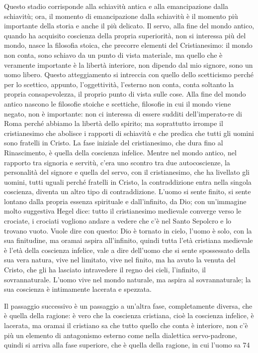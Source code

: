 \documentclass[a4paper,12pt,oneside,openany]{book}%
\begin{document}
Questo stadio corrisponde alla schiavitù antica e alla emancipazione dalla schiavitù; ora, il momento di emancipazione dalla schiavitù è il momento più importante della storia e anche il più delicato.
Il servo, alla fine del mondo antico, quando ha acquisito coscienza della propria superiorità, non si interessa più del mondo, nasce la filosofia stoica, che precorre elementi del Cristianesimo: il mondo non conta, sono schiavo da un punto di vista materiale, ma quello che è veramente importante è la libertà interiore, non dipendo dal mio signore, sono un uomo libero. Questo atteggiamento si intreccia con quello dello scetticismo perché per lo scettico, appunto, l’oggettività, l’esterno non conta, conta soltanto la propria consapevolezza, il proprio punto di vista sulle cose. Alla fine del mondo antico nascono le filosofie stoiche e scettiche, filosofie in cui il mondo viene negato, non è importante: non ci interessa di essere sudditi dell’imperato-re di Roma perché abbiamo la libertà dello spirito; ma soprattutto irrompe il cristianesimo che abolisce i rapporti di schiavitù e che predica che tutti gli uomini sono fratelli in Cristo. La fase iniziale del cristianesimo, che dura fino al Rinascimento, è quella della coscienza infelice. Mentre nel mondo antico, nel rapporto tra signoria e servitù, c’era uno scontro tra due autocoscienze, la personalità del signore e quella del servo, con il cristianesimo, che ha livellato gli uomini, tutti uguali perché fratelli in Cristo, la contraddizione entra nella singola coscienza, diventa un altro tipo di contraddizione. L’uomo si sente finito, si sente lontano dalla propria essenza spirituale e dall’infinito, da Dio; con un’immagine molto suggestiva Hegel dice: tutto il cristianesimo medievale converge verso le crociate, i crociati vogliono andare a vedere che c’è nel Santo Sepolcro e lo trovano vuoto. Vuole dire con questo: Dio è tornato in cielo, l’uomo è solo, con la sua finitudine, ma oramai aspira all’infinito, quindi tutta l’età cristiana medievale è l’età della coscienza infelice, vale a dire dell’uomo che si sente spossessato della sua vera natura, vive nel limitato, vive nel finito, ma ha avuto la venuta del Cristo, che gli ha lasciato intravedere il regno dei cieli, l’infinito, il sovrannaturale. L’uomo vive nel mondo naturale, ma aspira al sovrannaturale; la sua coscienza è intimamente lacerata e spezzata.

Il passaggio successivo è un passaggio a un’altra fase, completamente diversa, che è quella della ragione: è vero che la coscienza cristiana, cioè la coscienza infelice, è lacerata, ma oramai il cristiano sa che tutto quello che conta è interiore, non c’è più un elemento di antagonismo esterno come nella dialettica servo-padrone, quindi si arriva alla fase superiore, che è quella della ragione, in cui l’uomo sa 74
\end{document}
